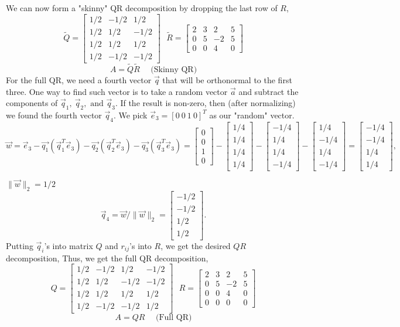 \documentclass{article}
\newcommand{\norm}[1]{\|#1\|}
\newcommand{\normII}[1]{\norm{#1}_2}
\newcommand{\bmat}[1]{\begin{bmatrix}#1\end{bmatrix}}
\newcommand{\tand}{\text{ and }}
\newcommand{\sij}{_{ij}}
\begin{document}
We can now form a "skinny" QR decomposition by dropping the last row of $R$,
\[ \tilde Q = \bmat{1/2 & -1/2 & 1/2 \\
		 	 		1/2 & 1/2 & -1/2 \\
		 	 		1/2 & 1/2 & 1/2 \\
		 	 		1/2 & -1/2 & -1/2}\ \ \ 
   \tilde R = \bmat{2 & 3 & 2 & 5 \\
		 	 0 & 5 & -2 & 5 \\
		 	 0 & 0 & 4  & 0} \]
\[ A = \tilde Q \tilde R\ \ \ \ \ \ \text{(Skinny QR)} \]
For the full QR, we need a fourth vector $\vec q$ that will be orthonormal to the first three. One way to find such vector is to take a random vector $\vec a$ and subtract the components of $\vec q_1,\ \vec q_2, \tand \vec q_3$. If the result is non-zero, then (after normalizing) we found the fourth vector $\vec q_4$. We pick $\vec e_3 = [0\ 0\ 1\ 0]^T$ as our "random" vector.
\[ \vec w = \vec e_3 - \vec{q_1}(\vec q_1^T \vec e_3) - \vec{q_2}(\vec q_2^T \vec e_3) - \vec{q_3}(\vec q_3^T \vec e_3) = \bmat{0 \\ 0 \\ 1 \\ 0} - \bmat{1/4 \\ 1/4 \\ 1/4 \\ 1/4} - \bmat{-1/4 \\ 1/4 \\ 1/4 \\ -1/4} - \bmat{1/4 \\ -1/4 \\ 1/4 \\ -1/4} = \bmat{-1/4 \\ -1/4 \\ 1/4 \\ 1/4}, \]

$\normII{\vec w} = 1/2$\\
\[ \vec q_4 = \vec w/\normII{\vec w} = \bmat{-1/2 \\ -1/2 \\ 1/2 \\ 1/2}. \]
Putting $\vec q_i$'s into matrix $Q$ and $r\sij$'s into $R$, we get the desired $QR$ decomposition,
Thus, we get the full QR decomposition,
\[ Q = \bmat{1/2 & -1/2 & 1/2 & -1/2 \\
		 	 1/2 & 1/2 & -1/2 & -1/2 \\
		 	 1/2 & 1/2 & 1/2  & 1/2 \\
		 	 1/2 & -1/2 & -1/2 & 1/2}\ \ \ 
   R = \bmat{2 & 3 & 2 & 5 \\
		 	 0 & 5 & -2 & 5 \\
		 	 0 & 0 & 4  & 0 \\
		 	 0 & 0 & 0  & 0} \]
\[ A = Q R\ \ \ \ \ \ \text{(Full QR)} \]
\end{document}

